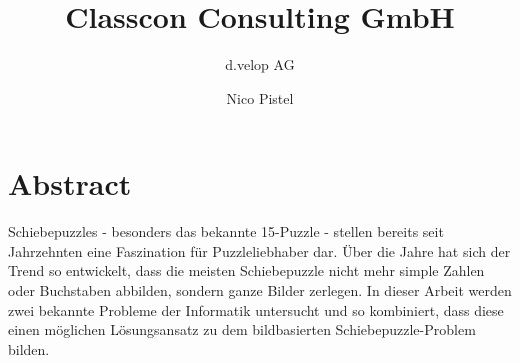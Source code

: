 \documentclass{whswinvcbook}
\title[Bericht]{Classcon Consulting GmbH}
\subtitle{d.velop AG}
\author[Nico Pistel]{Nico Pistel}
\begin{document}

\frontmatter


\cleardoublepage
\chapter*{Abstract}
Schiebepuzzles - besonders das bekannte 15-Puzzle - stellen bereits seit Jahrzehnten eine Faszination für Puzzleliebhaber dar. Über die Jahre hat sich der Trend so entwickelt, dass die meisten Schiebepuzzle nicht mehr simple Zahlen oder Buchstaben abbilden, sondern ganze Bilder zerlegen. In dieser Arbeit werden zwei bekannte Probleme der Informatik untersucht und so kombiniert, dass diese einen möglichen Lösungsansatz zu dem bildbasierten Schiebepuzzle-Problem bilden.

\tableofs
\lstlistoflistings
\listofalgorithms

\mainmatter
\end{document}
